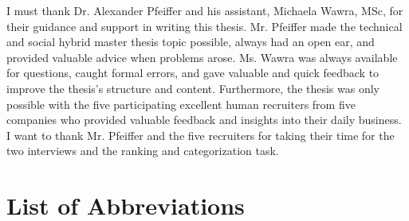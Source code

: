 \documentclass[draft,final]{thesisclass} %
\begin{document}
\frontmatter %

\addstatementpage
{} %


\begin{acknowledgements}
I must thank Dr. Alexander Pfeiffer and his assistant, Michaela Wawra, MSc, for their guidance and support in writing this thesis.
Mr. Pfeiffer made the technical and social hybrid master thesis topic possible, always had an open ear, and provided valuable advice when problems arose.
Ms. Wawra was always available for questions, caught formal errors, and gave valuable and quick feedback to improve the thesis's structure and content.
Furthermore, the thesis was only possible with the five participating excellent human recruiters from five companies who provided valuable feedback and insights into their daily business. I want to thank Mr. Pfeiffer and the five recruiters for taking their time for the two interviews and the ranking and categorization task.
\end{acknowledgements}

\listoffigures %
\cleardoublepage

\listoftables %
\cleardoublepage

\chapter{List of Abbreviations}
\begin{acronym}
\end{acronym}
\cleardoublepage
\end{document}

